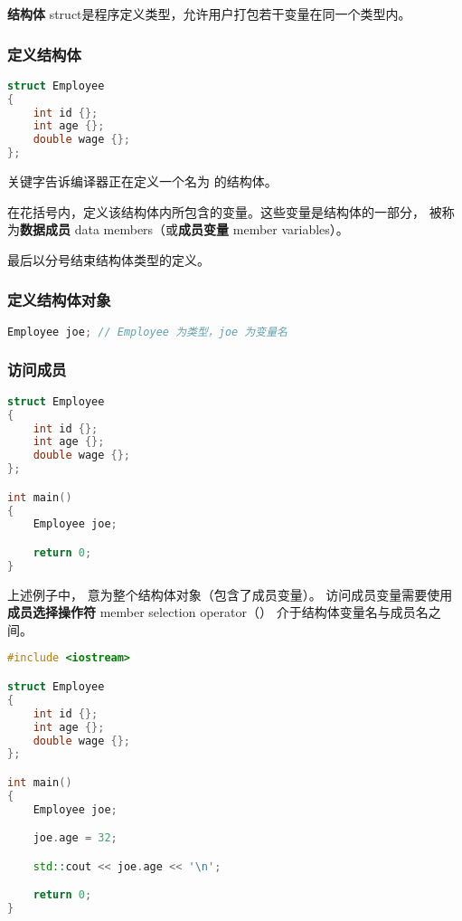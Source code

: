 \documentclass[../../LearnCpp.tex]{subfiles}
\begin{document}

\textbf{结构体} struct是程序定义类型，允许用户打包若干变量在同一个类型内。

\subsubsection*{定义结构体}

\begin{lstlisting}[language=C++]
struct Employee
{
    int id {};
    int age {};
    double wage {};
};
\end{lstlisting}

 关键字告诉编译器正在定义一个名为  的结构体。

在花括号内，定义该结构体内所包含的变量。这些变量是结构体的一部分，
被称为\textbf{数据成员} data members（或\textbf{成员变量} member variables）。

最后以分号结束结构体类型的定义。

\subsubsection*{定义结构体对象}

\begin{lstlisting}[language=C++]
Employee joe; // Employee 为类型，joe 为变量名
\end{lstlisting}

\subsubsection*{访问成员}

\begin{lstlisting}[language=C++]
struct Employee
{
    int id {};
    int age {};
    double wage {};
};

int main()
{
    Employee joe;

    return 0;
}
\end{lstlisting}

上述例子中， 意为整个结构体对象（包含了成员变量）。
访问成员变量需要使用\textbf{成员选择操作符} member selection operator（）
介于结构体变量名与成员名之间。

\begin{lstlisting}[language=C++]
#include <iostream>

struct Employee
{
    int id {};
    int age {};
    double wage {};
};

int main()
{
    Employee joe;

    joe.age = 32;

    std::cout << joe.age << '\n';

    return 0;
}
\end{lstlisting}
\end{document}

